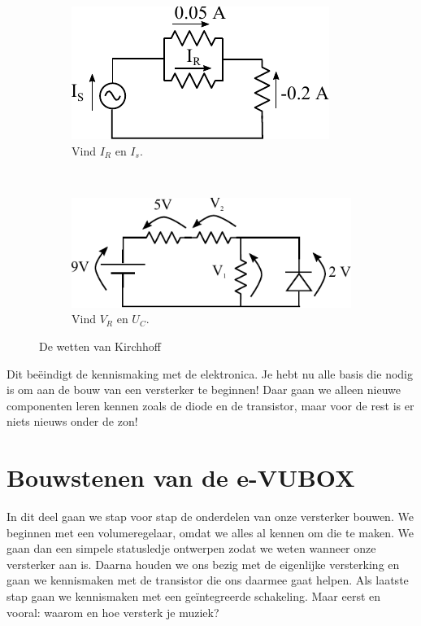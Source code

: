 \documentclass{article}
\begin{document}
			\begin{figure}[htbp]
				\centering
				\begin{subfigure}[b]{0.45\linewidth}
					\centering
					\includegraphics{kcl_oef.pdf}
					\caption{Vind $I_R$ en $I_s$.}
					\label{subfig:kcl_oef}
				\end{subfigure}
				~
				\begin{subfigure}[b]{0.45\linewidth}
					\centering
					\includegraphics{kvl_oef.pdf}
					\caption{Vind $V_R$ en $U_C$. }
					\label{subfig:kvl_oef}
				\end{subfigure}
			\caption{De wetten van Kirchhoff}
			\label{fig:kirchoff_oef}
			\end{figure}

			Dit be\"eindigt de kennismaking met de elektronica. Je hebt nu alle basis die nodig is om aan de bouw van een versterker te beginnen! Daar gaan we alleen nieuwe componenten leren kennen zoals de diode en de transistor, maar voor de rest is er niets nieuws onder de zon!

	\section{Bouwstenen van de e-VUBOX}
	\label{sec:bouwstenen}
		In dit deel gaan we stap voor stap de onderdelen van onze versterker bouwen. We beginnen met een volumeregelaar, omdat we alles al kennen om die te maken. We gaan dan een simpele statusledje ontwerpen zodat we weten wanneer onze versterker aan is. Daarna houden we ons bezig met de eigenlijke versterking en gaan we kennismaken met de transistor die ons daarmee gaat helpen. 
		Als laatste stap gaan we kennismaken met een ge\"integreerde schakeling. Maar eerst en vooral: waarom en hoe versterk je muziek?
\end{document}
